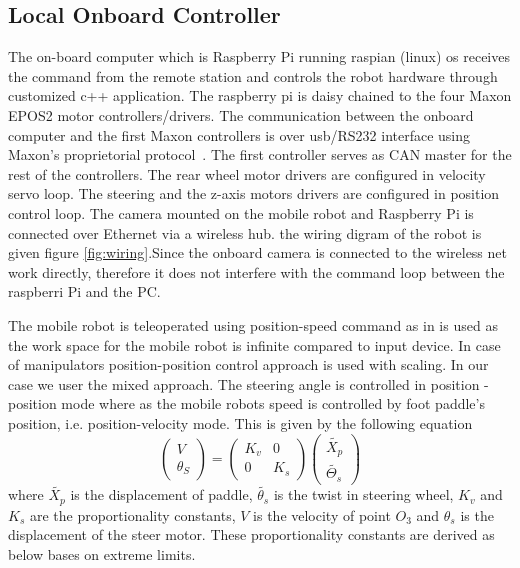\subsection{Local Onboard Controller}
The  on-board computer which is Raspberry Pi running raspian (linux) os receives the command from the remote station and controls the robot hardware through customized c++ application.
The raspberry pi  is daisy chained to the four Maxon EPOS2 motor controllers/drivers. The communication between the onboard computer and the first Maxon controllers is over usb/RS232 interface using Maxon's proprietorial protocol~\cite{maxonrs232}. The first controller serves as CAN master for the rest of the controllers. The rear wheel motor drivers are configured in velocity servo loop. The steering and the z-axis motors drivers are configured in position control loop.  The camera mounted on the mobile robot  and Raspberry Pi  is connected over Ethernet via a wireless hub. the wiring digram of the robot is given figure \ref {fig:wiring}.Since the onboard camera is connected to the wireless net work directly, therefore it does not interfere with the command loop between the raspberri Pi and the PC. 

The mobile robot is teleoperated using position-speed command as in \cite{farkhatdinov2007hybrid} is used as the work space for the mobile robot is infinite compared to input device. In case of manipulators position-position control approach is used with scaling. In our case we user the mixed approach. The steering angle is controlled in position -position mode where as the mobile robots speed is controlled by foot paddle's position, i.e. position-velocity mode. This is given by the following equation 
\begin{equation}
	\begin{pmatrix}
	V\\\theta_S
	\end{pmatrix}=
	\begin{pmatrix}
	K_v & 0\\0 & K_s
	\end{pmatrix}
	\begin{pmatrix}
	\tilde{X_p}\\
	\tilde{\Theta_s}
	\end{pmatrix}
\end{equation}
where $\tilde{X_p}$ is the displacement of  paddle, $\tilde{\theta_s}$ is the twist in steering wheel, $K_v$ and $K_s$ are the proportionality constants, $V$ is the velocity of point $O_3$ and $\theta_s$ is the displacement of the steer motor. These proportionality constants are derived as below bases on extreme limits. 

